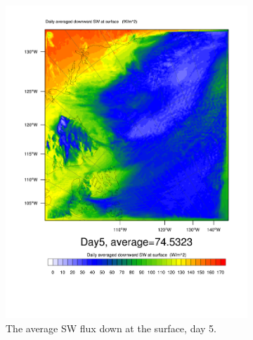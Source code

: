 \begin{figure}
\centering
	\begin{subfigure}{0.48\textwidth}
		\includegraphics[width=\textwidth]{results/control/SWDOWN_Day5.pdf}
		\caption{The average SW flux down at the surface, day 5.}
		\label{subfig:swdown_r1Day5}
	\end{subfigure}
	\quad
	\begin{subfigure}{0.48\textwidth}
		\centering

\end{subfigure}
\end{figure}
